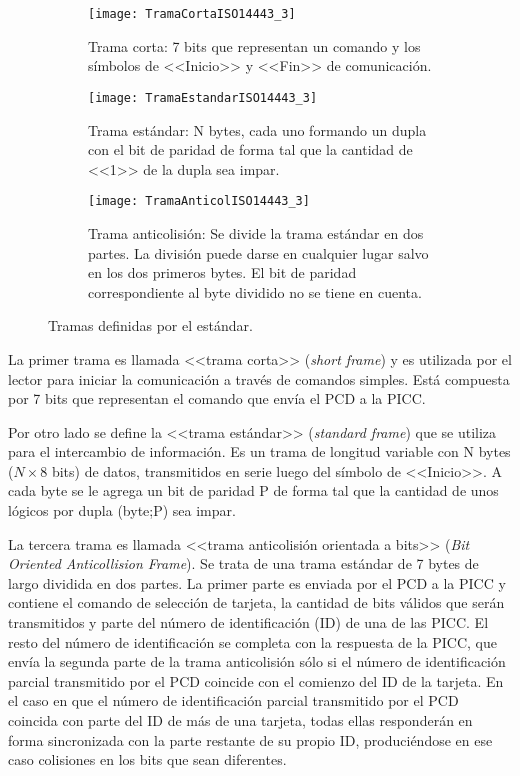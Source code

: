 \begin{figure}
	\centering
	\begin{subfigure}{\textwidth}
		\centering
		\texttt{[image: TramaCortaISO14443\_3]}
		\caption{Trama corta: 7 bits que representan un comando y los 
			símbolos de <<Inicio>> y <<Fin>> de comunicación.}
		\label{fig:TramaCortaISO14443_3}
    \end{subfigure}%
    \vspace{5mm}
    \begin{subfigure}{\textwidth}
	    \centering
		\texttt{[image: TramaEstandarISO14443\_3]}
		\caption{Trama estándar: N bytes, cada uno formando un dupla con el 
			bit de paridad de forma tal que la cantidad de <<1>> de la dupla sea 
			impar.}
		\label{fig:TramaEstandarISO14443_3}
    \end{subfigure}%
    \vspace{5mm}
    \begin{subfigure}{\textwidth}
		\centering
		\texttt{[image: TramaAnticolISO14443\_3]}
		\caption{Trama anticolisión: Se divide la trama estándar en dos 
			partes. La división puede darse en cualquier lugar salvo en los dos 
			primeros bytes. El bit de paridad correspondiente al byte dividido 
			no se tiene en cuenta.}
		\label{fig:TramaAnticolISO14443_3}
    \end{subfigure}%
	\caption{Tramas definidas por el estándar.}
	\label{fig:TramasISO14443_3}
\end{figure}


La primer trama es llamada <<trama corta>> (\emph{short frame}) y es 
utilizada por el lector para iniciar la comunicación a través de comandos 
simples. Está compuesta por 7 bits que representan el comando que envía el 
PCD a la PICC.

Por otro lado se define la <<trama estándar>> (\emph{standard frame}) que se 
utiliza para el intercambio de información. Es un trama de longitud variable 
con N bytes (\(N \times 8\) bits) de datos, transmitidos en serie luego del 
símbolo de <<Inicio>>. A cada byte se le agrega un bit de paridad P de forma 
tal que la cantidad de unos lógicos por dupla (byte;P) sea impar. 

La tercera trama es llamada <<trama anticolisión orientada a bits>> (\emph
{Bit Oriented Anticollision Frame}). Se trata de una trama estándar de 7 
bytes de largo dividida en dos partes. La primer parte es enviada por el PCD 
a la PICC y contiene el comando de selección de tarjeta, la cantidad de bits 
válidos que serán transmitidos y parte del número de identificación (ID) de 
una de las PICC. El resto del número de identificación se completa con la 
respuesta de la PICC, que envía la segunda parte de la trama anticolisión 
sólo si el número de identificación parcial transmitido por el PCD coincide 
con el comienzo del ID de la tarjeta. En el caso en que el número de 
identificación parcial transmitido por el PCD coincida con parte del ID de 
más de una tarjeta, todas ellas responderán en forma sincronizada con la 
parte restante de su propio ID, produciéndose en ese caso colisiones en los 
bits que sean diferentes.

